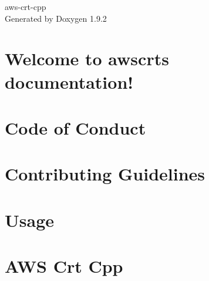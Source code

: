 \documentclass[twoside]{book}
\newcommand{\+}{\discretionary{\mbox{\scriptsize$\hookleftarrow$}}{}{}}
\newcommand{\clearemptydoublepage}{%
    \newpage{\pagestyle{empty}\cleardoublepage}%
  }
\begin{document}
  \raggedbottom
    \hypersetup{pageanchor=false,
                bookmarksnumbered=true,
                pdfencoding=unicode
               }
  \begin{titlepage}
  \vspace*{7cm}
  \begin{center}%
  {\Large aws-\/crt-\/cpp}\\
  \vspace*{1cm}
  {\large Generated by Doxygen 1.9.2}\\
  \end{center}
  \end{titlepage}
  \clearemptydoublepage
  \tableofcontents
  \clearemptydoublepage
  \hypersetup{pageanchor=true}
\chapter{Welcome to awscrt\textquotesingle{}s documentation!}
\label{index}\hypertarget{index}{}
\chapter{Code of Conduct}
\label{md___users_dengket_project_crts_aws_crt_cpp__c_o_d_e__o_f__c_o_n_d_u_c_t}

\chapter{Contributing Guidelines}
\label{md___users_dengket_project_crts_aws_crt_cpp__c_o_n_t_r_i_b_u_t_i_n_g}

\chapter{Usage}
\label{md__r_e_a_d_m_e}

\chapter{AWS Crt Cpp}
\label{md___users_dengket_project_crts_aws_crt_cpp__r_e_a_d_m_e}

\end{document}
